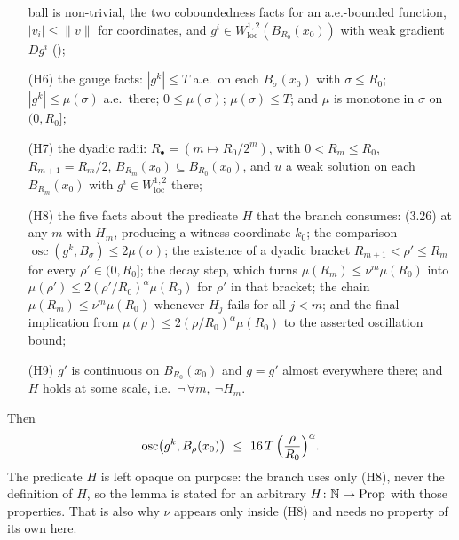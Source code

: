 \begin{helper}
\begin{enumerate}
  ball is non-trivial, the two coboundedness facts for an a.e.-bounded
  function, $|v_i|\le\|v\|$ for coordinates, and $g^i\in
  W^{1,2}_{\mathrm{loc}}(B_{R_0}(x_0))$ with weak gradient $Dg^i$
  ();
\item[(H6)] the gauge facts: $|g^k|\le T$ a.e.\ on each $B_\sigma(x_0)$ with
  $\sigma\le R_0$; $|g^k|\le\mu(\sigma)$ a.e.\ there; $0\le\mu(\sigma)$;
  $\mu(\sigma)\le T$; and $\mu$ is monotone in $\sigma$ on $(0,R_0]$;
\item[(H7)] the dyadic radii: $R_\bullet=(m\mapsto R_0/2^m)$, with
  $0<R_m\le R_0$, $R_{m+1}=R_m/2$, $B_{R_m}(x_0)\subseteq B_{R_0}(x_0)$, and
  $u$ a weak solution on each $B_{R_m}(x_0)$ with
  $g^i\in W^{1,2}_{\mathrm{loc}}$ there;
\item[(H8)] the five facts about the predicate $H$ that the branch consumes:
  (3.26) at any $m$ with $H_m$, producing a witness coordinate $k_0$; the
  comparison $\operatorname*{osc}(g^k,B_\sigma)\le2\mu(\sigma)$; the existence
  of a dyadic bracket $R_{m+1}<\rho'\le R_m$ for every $\rho'\in(0,R_0]$; the
  decay step, which turns $\mu(R_m)\le\nu^m\mu(R_0)$ into
  $\mu(\rho')\le2(\rho'/R_0)^{\alpha}\mu(R_0)$ for $\rho'$ in that bracket; the
  chain $\mu(R_m)\le\nu^m\mu(R_0)$ whenever $H_j$ fails for all $j<m$; and the
  final implication from $\mu(\rho)\le2(\rho/R_0)^{\alpha}\mu(R_0)$ to the
  asserted oscillation bound;
\item[(H9)] $g'$ is continuous on $B_{R_0}(x_0)$ and $g=g'$ almost everywhere
  there; and $H$ holds at some scale, i.e.\ $\neg\,\forall m,\ \neg H_m$.
\end{enumerate}
Then
\[
\operatorname*{osc}\bigl(g^k,B_\rho(x_0)\bigr)\ \le\ 16\,T\,
  \Bigl(\frac{\rho}{R_0}\Bigr)^{\alpha}.
\]
The predicate $H$ is left opaque on purpose: the branch uses only (H8), never
the definition of $H$, so the lemma is stated for an arbitrary
$H\colon\mathbb{N}\to\mathrm{Prop}$ with those properties.  That is also why $\nu$
appears only inside (H8) and needs no property of its own here.
\end{helper}
